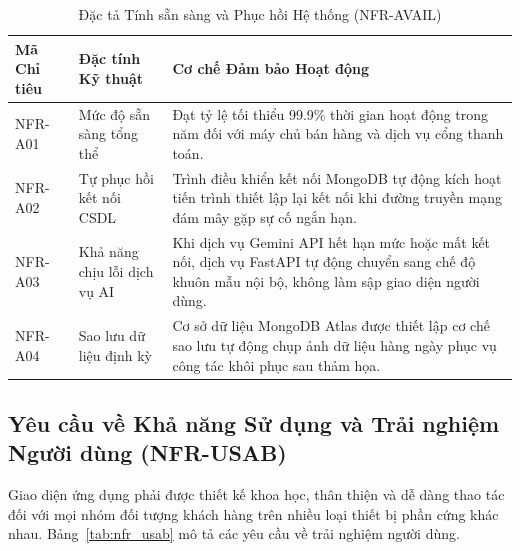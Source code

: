 \begin{table}[H]
\centering
\caption{Đặc tả Tính sẵn sàng và Phục hồi Hệ thống (NFR-AVAIL)}
\label{tab:nfr_avail}
\begin{tabularx}{\textwidth}{p{2.5cm}p{4.5cm}X}
\toprule
\textbf{Mã Chỉ tiêu} & \textbf{Đặc tính Kỹ thuật} & \textbf{Cơ chế Đảm bảo Hoạt động} \\
\midrule
NFR-A01 & Mức độ sẵn sàng tổng thể & Đạt tỷ lệ tối thiểu 99.9\% thời gian hoạt động trong năm đối với máy chủ bán hàng và dịch vụ cổng thanh toán. \\
\addlinespace
NFR-A02 & Tự phục hồi kết nối CSDL & Trình điều khiển kết nối MongoDB tự động kích hoạt tiến trình thiết lập lại kết nối khi đường truyền mạng đám mây gặp sự cố ngắn hạn. \\
\addlinespace
NFR-A03 & Khả năng chịu lỗi dịch vụ AI & Khi dịch vụ Gemini API hết hạn mức hoặc mất kết nối, dịch vụ FastAPI tự động chuyển sang chế độ khuôn mẫu nội bộ, không làm sập giao diện người dùng. \\
\addlinespace
NFR-A04 & Sao lưu dữ liệu định kỳ & Cơ sở dữ liệu MongoDB Atlas được thiết lập cơ chế sao lưu tự động chụp ảnh dữ liệu hàng ngày phục vụ công tác khôi phục sau thảm họa. \\
\bottomrule
\end{tabularx}
\end{table}

\subsection{Yêu cầu về Khả năng Sử dụng và Trải nghiệm Người dùng (NFR-USAB)}
Giao diện ứng dụng phải được thiết kế khoa học, thân thiện và dễ dàng thao tác đối với mọi nhóm đối tượng khách hàng trên nhiều loại thiết bị phần cứng khác nhau. Bảng~\ref{tab:nfr_usab} mô tả các yêu cầu về trải nghiệm người dùng.

